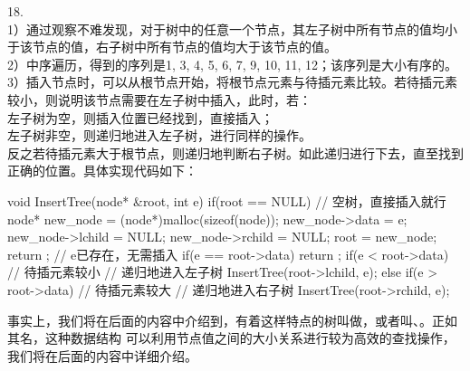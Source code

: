 18. \\1）通过观察不难发现，对于树中的任意一个节点，其左子树中所有节点的值均小于该节点的值，右子树中所有节点的值均大于该节点的值。\\
2）中序遍历，得到的序列是1, 3, 4, 5, 6, 7, 9, 10, 11, 12；该序列是大小有序的。\\
3）插入节点时，可以从根节点开始，将根节点元素与待插元素比较。若待插元素较小，则说明该节点需要在左子树中插入，此时，若：\\
 左子树为空，则插入位置已经找到，直接插入；\\
 左子树非空，则递归地进入左子树，进行同样的操作。\\
反之若待插元素大于根节点，则递归地判断右子树。如此递归进行下去，直至找到正确的位置。具体实现代码如下：
\begin{cppcode}
    void InsertTree(node* &root, int e) {
        if(root == NULL) {
            // 空树，直接插入就行
            node* new_node = (node*)malloc(sizeof(node));
            new_node->data = e;
            new_node->lchild = NULL;
            new_node->rchild = NULL;
            root = new_node;
            return ;
        }
        // e已存在，无需插入
        if(e == root->data) {
            return ;
        }
        if(e < root->data) {   // 待插元素较小
            // 递归地进入左子树
            InsertTree(root->lchild, e);
        }
        else if(e > root->data) {    // 待插元素较大
            // 递归地进入右子树
            InsertTree(root->rchild, e);
        }
    }
\end{cppcode}
事实上，我们将在后面的内容中介绍到，有着这样特点的树叫做，或者叫、。正如其名，这种数据结构
可以利用节点值之间的大小关系进行较为高效的查找操作，我们将在后面的内容中详细介绍。

